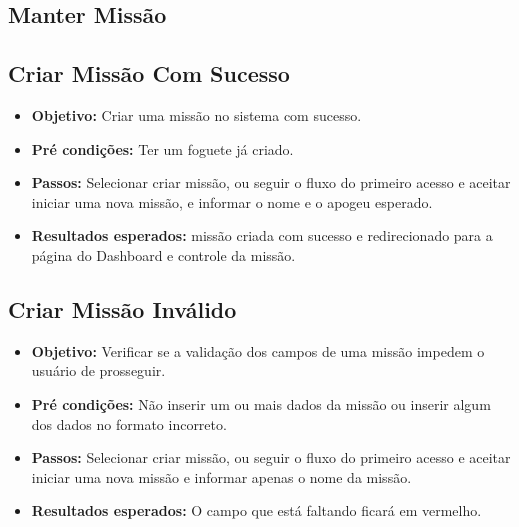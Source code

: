 \begin{apendicesenv}
\section{Manter Missão}
\subsection{Criar Missão Com Sucesso}
\begin{itemize} 
    \item \textbf{Objetivo:} Criar uma missão no sistema com sucesso.
    \item \textbf{Pré condições:} Ter um foguete já criado.
    \item \textbf{Passos:} Selecionar criar missão, ou seguir o fluxo do primeiro acesso e aceitar iniciar uma nova missão, e informar o nome e o apogeu esperado.
    \item \textbf{Resultados esperados:} missão criada com sucesso e redirecionado para a página do Dashboard e controle da missão.
\end{itemize}

\subsection{Criar Missão Inválido}
\begin{itemize} 
    \item \textbf{Objetivo:} Verificar se a validação dos campos de uma missão impedem o usuário de prosseguir.
    \item \textbf{Pré condições:} Não inserir um ou mais dados da missão ou inserir algum dos dados no formato incorreto.
    \item \textbf{Passos:} Selecionar criar missão, ou seguir o fluxo do primeiro acesso e aceitar iniciar uma nova missão e informar apenas o nome da missão.
    \item \textbf{Resultados esperados:} O campo que está faltando ficará em vermelho.
\end{itemize}


\end{apendicesenv}
